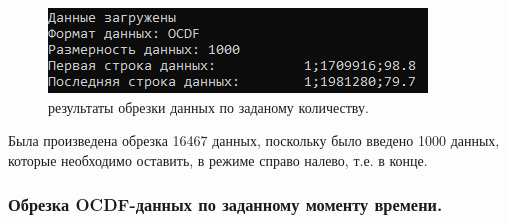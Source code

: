 {  \begin{figure}[H]
    \centering
    \includegraphics{images/forDataManipulator/ExOCDFdataAftCatQuan.png}
    \caption{результаты обрезки данных по заданому количеству.} 
    \label{fig:ExOCDFdataAftCatQuan}
  \end{figure}

  \par Была произведена обрезка 16467 данных, поскольку было введено 1000 данных, которые необходимо оставить, в режиме справо налево, т.е. в конце. 

  \par 
}

\subsubsection{ \standartTitleFont
  Обрезка OCDF-данных по заданному моменту времени. 
}

